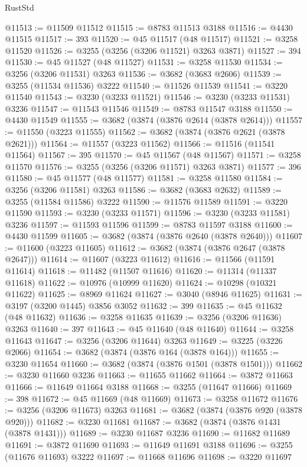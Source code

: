 \begin{lexlean}{RustStd}
\begin{coremodule}
{\begin{coremodule}
{{{{{{{{{{{{{{{{{{{{{{{{{{{{{{{{{{{{{@11513 := @11509 @11512
@11515 := @8783 @11513 @3188
@11516 := @4430 @11515
@11517 := 393
@11520 := @45 @11517 (@48 @11517)
@11521 := @3258 @11520
@11526 := @3255 (@3256 (@3206 @11521) @3263 @3871)
@11527 := 394
@11530 := @45 @11527 (@48 @11527)
@11531 := @3258 @11530
@11534 := @3256 (@3206 @11531) @3263
@11536 := @3682 (@3683 @2606)
@11539 := @3255 (@11534 @11536) @3222
@11540 := @11526 @11539
@11541 := @3220 @11540
@11543 := @3230 (@3233 @11521)
@11546 := @3230 (@3233 @11531) @3236
@11547 := @11543 @11546
@11549 := @8783 @11547 @3188
@11550 := @4430 @11549
@11555 := @3682 (@3874 (@3876 @2614 (@3878 @2614)))
@11557 := @11550 (@3223 @11555)
@11562 := @3682 (@3874 (@3876 @2621 (@3878 @2621)))
@11564 := @11557 (@3223 @11562)
@11566 := @11516 (@11541 @11564)
@11567 := 395
@11570 := @45 @11567 (@48 @11567)
@11571 := @3258 @11570
@11576 := @3255 (@3256 (@3206 @11571) @3263 @3871)
@11577 := 396
@11580 := @45 @11577 (@48 @11577)
@11581 := @3258 @11580
@11584 := @3256 (@3206 @11581) @3263
@11586 := @3682 (@3683 @2632)
@11589 := @3255 (@11584 @11586) @3222
@11590 := @11576 @11589
@11591 := @3220 @11590
@11593 := @3230 (@3233 @11571)
@11596 := @3230 (@3233 @11581) @3236
@11597 := @11593 @11596
@11599 := @8783 @11597 @3188
@11600 := @4430 @11599
@11605 := @3682 (@3874 (@3876 @2640 (@3878 @2640)))
@11607 := @11600 (@3223 @11605)
@11612 := @3682 (@3874 (@3876 @2647 (@3878 @2647)))
@11614 := @11607 (@3223 @11612)
@11616 := @11566 (@11591 @11614)
@11618 := @11482 (@11507 @11616)
@11620 := @11314 (@11337 @11618)
@11622 := @10976 (@10999 @11620)
@11624 := @10298 (@10321 @11622)
@11625 := @8969 @11624
@11627 := @3040 (@8946 @11625)
@11631 := @3197 (@3200 @1445) @3856 @3052
@11632 := 399
@11635 := @45 @11632 (@48 @11632)
@11636 := @3258 @11635
@11639 := @3256 (@3206 @11636) @3263
@11640 := 397
@11643 := @45 @11640 (@48 @11640)
@11644 := @3258 @11643
@11647 := @3256 (@3206 @11644) @3263
@11649 := @3225 (@3226 @2066)
@11654 := @3682 (@3874 (@3876 @164 (@3878 @164)))
@11655 := @3230 @11654
@11660 := @3682 (@3874 (@3876 @1501 (@3878 @1501)))
@11662 := @3230 @11660 @3236
@11663 := @11655 @11662
@11664 := @3872 @11663
@11666 := @11649 @11664 @3188
@11668 := @3255 (@11647 @11666)
@11669 := 398
@11672 := @45 @11669 (@48 @11669)
@11673 := @3258 @11672
@11676 := @3256 (@3206 @11673) @3263
@11681 := @3682 (@3874 (@3876 @920 (@3878 @920)))
@11682 := @3230 @11681
@11687 := @3682 (@3874 (@3876 @1431 (@3878 @1431)))
@11689 := @3230 @11687 @3236
@11690 := @11682 @11689
@11691 := @3872 @11690
@11693 := @11649 @11691 @3188
@11696 := @3255 (@11676 @11693) @3222
@11697 := @11668 @11696
@11698 := @3220 @11697
}}}}}}}}}}}}}}}}}}}}}}}}}}}}}}}}}}}}}
\end{coremodule}}
\end{coremodule}
\end{lexlean}
